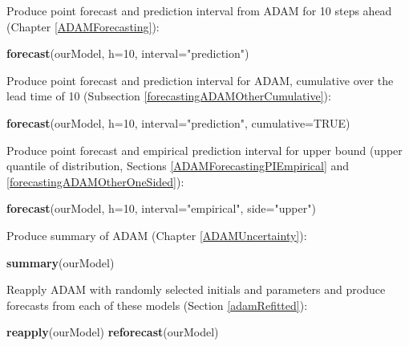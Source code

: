 \documentclass[]{book}
\newenvironment{Shaded}{\begin{snugshade}}{\end{snugshade}}
\newcommand{\DataTypeTok}[1]{\textcolor[rgb]{0.13,0.29,0.53}{#1}}
\newcommand{\DecValTok}[1]{\textcolor[rgb]{0.00,0.00,0.81}{#1}}
\newcommand{\KeywordTok}[1]{\textcolor[rgb]{0.13,0.29,0.53}{\textbf{#1}}}
\newcommand{\NormalTok}[1]{#1}
\newcommand{\OtherTok}[1]{\textcolor[rgb]{0.56,0.35,0.01}{#1}}
\newcommand{\StringTok}[1]{\textcolor[rgb]{0.31,0.60,0.02}{#1}}
\theoremstyle{definition}
\theoremstyle{definition}
\theoremstyle{definition}
\theoremstyle{definition}
\theoremstyle{remark}
\begin{document}
Produce point forecast and prediction interval from ADAM for 10 steps ahead (Chapter \ref{ADAMForecasting}):

\begin{Shaded}
\begin{Highlighting}[]
\KeywordTok{forecast}\NormalTok{(ourModel, }\DataTypeTok{h=}\DecValTok{10}\NormalTok{, }\DataTypeTok{interval=}\StringTok{"prediction"}\NormalTok{)}
\end{Highlighting}
\end{Shaded}

Produce point forecast and prediction interval for ADAM, cumulative over the lead time of 10 (Subsection \ref{forecastingADAMOtherCumulative}):

\begin{Shaded}
\begin{Highlighting}[]
\KeywordTok{forecast}\NormalTok{(ourModel, }\DataTypeTok{h=}\DecValTok{10}\NormalTok{, }\DataTypeTok{interval=}\StringTok{"prediction"}\NormalTok{,}
         \DataTypeTok{cumulative=}\OtherTok{TRUE}\NormalTok{)}
\end{Highlighting}
\end{Shaded}

Produce point forecast and empirical prediction interval for upper bound (upper quantile of distribution, Sections \ref{ADAMForecastingPIEmpirical} and \ref{forecastingADAMOtherOneSided}):

\begin{Shaded}
\begin{Highlighting}[]
\KeywordTok{forecast}\NormalTok{(ourModel, }\DataTypeTok{h=}\DecValTok{10}\NormalTok{, }\DataTypeTok{interval=}\StringTok{"empirical"}\NormalTok{,}
         \DataTypeTok{side=}\StringTok{"upper"}\NormalTok{)}
\end{Highlighting}
\end{Shaded}

Produce summary of ADAM (Chapter \ref{ADAMUncertainty}):

\begin{Shaded}
\begin{Highlighting}[]
\KeywordTok{summary}\NormalTok{(ourModel)}
\end{Highlighting}
\end{Shaded}

Reapply ADAM with randomly selected initials and parameters and produce forecasts from each of these models (Section \ref{adamRefitted}):

\begin{Shaded}
\begin{Highlighting}[]
\KeywordTok{reapply}\NormalTok{(ourModel)}
\KeywordTok{reforecast}\NormalTok{(ourModel)}
\end{Highlighting}
\end{Shaded}
\end{document}
